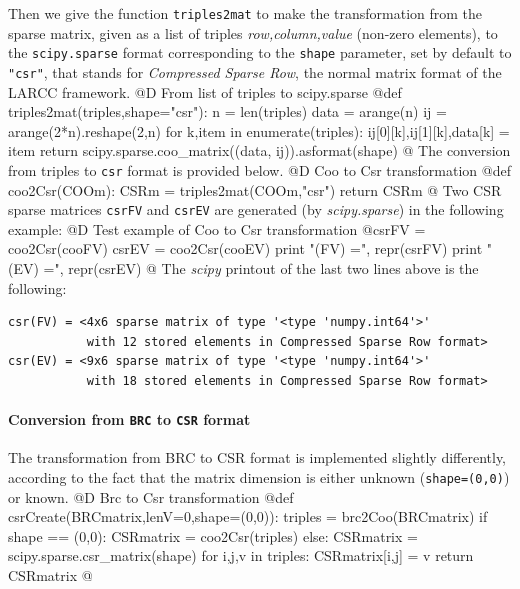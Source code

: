 \documentclass[11pt,oneside]{article}    %
\begin{document}
Then we give the function \texttt{triples2mat} to make the transformation from the sparse matrix, given as a list of triples \emph{row,column,value} (non-zero elements), to the \texttt{scipy.sparse} format corresponding to the \texttt{shape} parameter, set by default to \texttt{"csr"}, that stands for \emph{Compressed Sparse Row}, the normal matrix format of the LARCC framework. 
@D From list of triples to scipy.sparse
@{def triples2mat(triples,shape="csr"):
    n = len(triples)
    data = arange(n)
    ij = arange(2*n).reshape(2,n)
    for k,item in enumerate(triples):
        ij[0][k],ij[1][k],data[k] = item
    return scipy.sparse.coo_matrix((data, ij)).asformat(shape)
@}
The conversion from triples to \texttt{csr} format is provided below.
@D Coo to Csr transformation
@{def coo2Csr(COOm):
    CSRm = triples2mat(COOm,"csr")
    return CSRm
@}
Two CSR sparse matrices \texttt{csrFV} and \texttt{csrEV} are generated (by \emph{scipy.sparse})  in the following example:
@D Test example of Coo to Csr transformation
@{csrFV = coo2Csr(cooFV)
csrEV = coo2Csr(cooEV)
print "\ncsr(FV) =\n", repr(csrFV)
print "\ncsr(EV) =\n", repr(csrEV)
@}
The \emph{scipy} printout of the last two lines above is the following:
{\small
\begin{verbatim}
csr(FV) = <4x6 sparse matrix of type '<type 'numpy.int64'>'
           with 12 stored elements in Compressed Sparse Row format>
csr(EV) = <9x6 sparse matrix of type '<type 'numpy.int64'>'
           with 18 stored elements in Compressed Sparse Row format>
\end{verbatim}}

\paragraph{Conversion from \texttt{BRC} to \texttt{CSR} format}
The transformation from BRC to CSR format is implemented slightly differently, according to the fact that the matrix dimension is either unknown (\texttt{shape=(0,0)}) or known.
@D Brc to Csr transformation
@{def csrCreate(BRCmatrix,lenV=0,shape=(0,0)):
    triples = brc2Coo(BRCmatrix)
    if shape == (0,0):
        CSRmatrix = coo2Csr(triples)
    else:
        CSRmatrix = scipy.sparse.csr_matrix(shape)
        for i,j,v in triples: CSRmatrix[i,j] = v
    return CSRmatrix
@}
\end{document}
